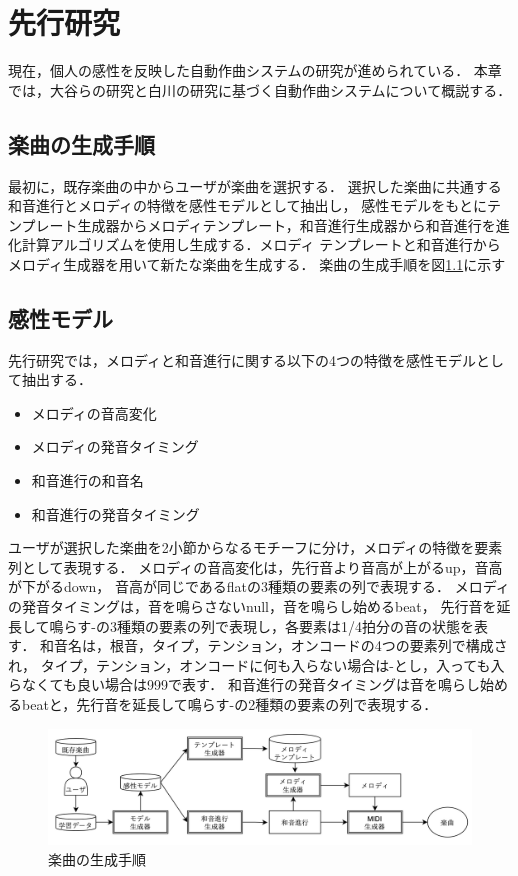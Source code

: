 \chapter{先行研究}
現在，個人の感性を反映した自動作曲システムの研究が進められている．
本章では，大谷らの研究\cite{otani16}と白川の研究\cite{Shirakawa14}に基づく自動作曲システムについて概説する．

\section{楽曲の生成手順}
最初に，既存楽曲の中からユーザが楽曲を選択する．
選択した楽曲に共通する和音進行とメロディの特徴を感性モデルとして抽出し，
感性モデルをもとにテンプレート生成器からメロディテンプレート，和音進行生成器から和音進行を進化計算アルゴリズムを使用し生成する．メロディ
テンプレートと和音進行からメロディ生成器を用いて新たな楽曲を生成する．
楽曲の生成手順を図\ref{fig:make}に示す

\section{感性モデル}
先行研究では，メロディと和音進行に関する以下の4つの特徴を感性モデルとして抽出する．
\begin{itemize}
    \item メロディの音高変化
    \item メロディの発音タイミング
    \item 和音進行の和音名
    \item 和音進行の発音タイミング
\end{itemize}
ユーザが選択した楽曲を2小節からなるモチーフに分け，メロディの特徴を要素列として表現する．
メロディの音高変化は，先行音より音高が上がるup，音高が下がるdown，
音高が同じであるﬂatの3種類の要素の列で表現する．
メロディの発音タイミングは，音を鳴らさないnull，音を鳴らし始めるbeat，
先行音を延長して鳴らす-の3種類の要素の列で表現し，各要素は1/4拍分の音の状態を表す．
和音名は，根音，タイプ，テンション，オンコードの4つの要素列で構成され，
タイプ，テンション，オンコードに何も入らない場合は-とし，入っても入らなくても良い場合は999で表す．
和音進行の発音タイミングは音を鳴らし始めるbeatと，先行音を延長して鳴らす-の2種類の要素の列で表現する．

\begin{figure}[htb]
  \begin{center}
  \includegraphics[scale=0.5]{image/make.png}
  \caption{楽曲の生成手順}
  \label{fig:make}
  \end{center}
\end{figure}

